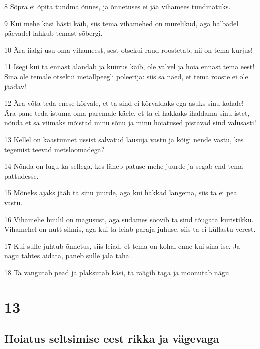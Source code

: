 \par 8 Sõpra ei õpita tundma õnnes, ja õnnetuses ei jää vihamees tundmatuks.
\par 9 Kui mehe käsi hästi käib, siis tema vihamehed on murelikud, aga halbadel päevadel lahkub temast sõbergi.
\par 10 Ära iialgi usu oma vihameest, sest otsekui raud roostetab, nii on tema kurjus!
\par 11 Isegi kui ta ennast alandab ja küürus käib, ole valvel ja hoia ennast tema eest! Sina ole temale otsekui metallpeegli poleerija: siis sa näed, et tema rooste ei ole jäädav!
\par 12 Ära võta teda enese kõrvale, et ta sind ei kõrvaldaks ega asuks sinu kohale! Ära pane teda istuma oma paremale käele, et ta ei hakkaks ihaldama sinu istet, nõnda et sa viimaks mõistad minu sõnu ja minu hoiatused pistavad sind valusasti!
\par 13 Kellel on kaastunnet ussist salvatud lausuja vastu ja kõigi nende vastu, kes tegemist teevad metsloomadega?
\par 14 Nõnda on lugu ka sellega, kes läheb patuse mehe juurde ja segab end tema pattudesse.
\par 15 Mõneks ajaks jääb ta sinu juurde, aga kui hakkad langema, siis ta ei pea vastu.
\par 16 Vihamehe huulil on magusust, aga südames soovib ta sind tõugata kuristikku. Vihamehel on nutt silmis, aga kui ta leiab paraja juhuse, siis ta ei küllastu verest.
\par 17 Kui sulle juhtub õnnetus, siis leiad, et tema on kohal enne kui sina ise. Ja nagu tahtes aidata, paneb sulle jala taha.
\par 18 Ta vangutab pead ja plaksutab käsi, ta räägib taga ja moonutab nägu.

\chapter{13}

\section*{Hoiatus seltsimise eest rikka ja vägevaga}

